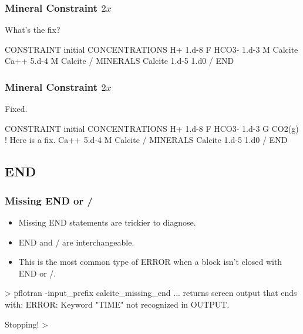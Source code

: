 \documentclass{beamer}
\newcommand\gehcomment[1]{{{\color{orange} #1}}}
\newcommand\redcomment[1]{{{\color{red} #1}}}
\newcommand\bluecomment[1]{{{\color{blue} #1}}}
\newcommand\greencomment[1]{{{\color{green} #1}}}
\newcommand\magentacomment[1]{{{\color{magenta} #1}}}
\begin{document}
\begin{frame}\frametitle{Mineral Constraint ${2x}$}
\redcomment{What's the fix?}
\begin{semiverbatim}

CONSTRAINT initial
  CONCENTRATIONS
    H+     1.d-8      F
    HCO3-  1.d-3      M  Calcite
    Ca++   5.d-4      M  Calcite
  /
  MINERALS
    Calcite 1.d-5 1.d0
  /
END
\end{semiverbatim}

\end{frame}

\begin{frame}\frametitle{Mineral Constraint ${2x}$}

\redcomment{Fixed.}
\begin{semiverbatim}

CONSTRAINT initial
  CONCENTRATIONS
    H+     1.d-8      F
    HCO3-  1.d-3      \magentacomment{G  CO2(g)} \bluecomment{! Here is a fix.}
    Ca++   5.d-4      M  Calcite
  /
  MINERALS
    Calcite 1.d-5 1.d0
  /
END
\end{semiverbatim}

\end{frame}

\subsection{END}

\begin{frame}\frametitle{Missing \greencomment{END} or \greencomment{/}}
\begin{itemize}
\item Missing \greencomment{END} statements are trickier to diagnose.
\item \greencomment{END} and \greencomment{/} are interchangeable.
\item This is the most common type of ERROR when a block isn't closed with \greencomment{END} or \greencomment{/}.
\end{itemize}
\begin{semiverbatim}

> pflotran -input_prefix calcite_missing_end
... \gehcomment{returns screen output that ends with:}
  ERROR:  Keyword "TIME" not recognized in OUTPUT.

  Stopping!
>
\end{semiverbatim}

\end{frame}
\end{document}
